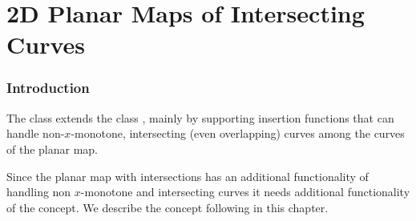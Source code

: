 



\chapter{2D Planar Maps of Intersecting Curves}

\subsection*{Introduction}

The class  extends the class
, mainly by supporting insertion functions that can 
handle non-$x$-monotone, intersecting (even overlapping) curves among the 
curves of the planar map.

Since the planar map with intersections has an additional
functionality of handling non $x$-monotone and intersecting curves
it needs additional functionality of the  concept. 
We describe the  concept following 
in this chapter. 


